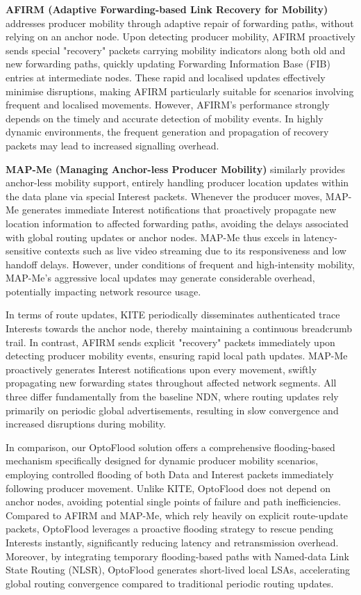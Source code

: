 \documentclass[10pt,conference]{IEEEtran}
\begin{document}
\textbf{AFIRM (Adaptive Forwarding-based Link Recovery for Mobility)} \cite{AFIRM} addresses producer mobility through adaptive repair of forwarding paths, without relying on an anchor node. Upon detecting producer mobility, AFIRM proactively sends special "recovery" packets carrying mobility indicators along both old and new forwarding paths, quickly updating Forwarding Information Base (FIB) entries at intermediate nodes. These rapid and localised updates effectively minimise disruptions, making AFIRM particularly suitable for scenarios involving frequent and localised movements. However, AFIRM's performance strongly depends on the timely and accurate detection of mobility events. In highly dynamic environments, the frequent generation and propagation of recovery packets may lead to increased signalling overhead.

\textbf{MAP-Me (Managing Anchor-less Producer Mobility)} \cite{MAPME} similarly provides anchor-less mobility support, entirely handling producer location updates within the data plane via special Interest packets. Whenever the producer moves, MAP-Me generates immediate Interest notifications that proactively propagate new location information to affected forwarding paths, avoiding the delays associated with global routing updates or anchor nodes. MAP-Me thus excels in latency-sensitive contexts such as live video streaming due to its responsiveness and low handoff delays. However, under conditions of frequent and high-intensity mobility, MAP-Me's aggressive local updates may generate considerable overhead, potentially impacting network resource usage.

In terms of route updates, KITE periodically disseminates authenticated trace Interests towards the anchor node, thereby maintaining a continuous breadcrumb trail. In contrast, AFIRM sends explicit "recovery" packets immediately upon detecting producer mobility events, ensuring rapid local path updates. MAP-Me proactively generates Interest notifications upon every movement, swiftly propagating new forwarding states throughout affected network segments. All three differ fundamentally from the baseline NDN, where routing updates rely primarily on periodic global advertisements, resulting in slow convergence and increased disruptions during mobility.

In comparison, our OptoFlood solution offers a comprehensive flooding-based mechanism specifically designed for dynamic producer mobility scenarios, employing controlled flooding of both Data and Interest packets immediately following producer movement. Unlike KITE, OptoFlood does not depend on anchor nodes, avoiding potential single points of failure and path inefficiencies. Compared to AFIRM and MAP-Me, which rely heavily on explicit route-update packets, OptoFlood leverages a proactive flooding strategy to rescue pending Interests instantly, significantly reducing latency and retransmission overhead. Moreover, by integrating temporary flooding-based paths with Named-data Link State Routing (NLSR), OptoFlood generates short-lived local LSAs, accelerating global routing convergence compared to traditional periodic routing updates.
\end{document}
